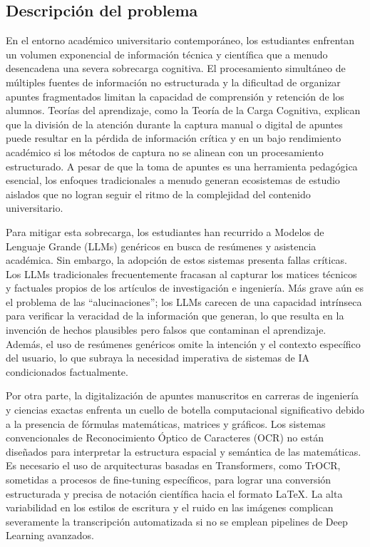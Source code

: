 \subsection{Descripción del problema}
En el entorno académico universitario contemporáneo, los estudiantes enfrentan un volumen exponencial de información técnica y científica que a menudo desencadena una severa sobrecarga cognitiva. El procesamiento simultáneo de múltiples fuentes de información no estructurada y la dificultad de organizar apuntes fragmentados limitan la capacidad de comprensión y retención de los alumnos. Teorías del aprendizaje, como la Teoría de la Carga Cognitiva, explican que la división de la atención durante la captura manual o digital de apuntes puede resultar en la pérdida de información crítica y en un bajo rendimiento académico si los métodos de captura no se alinean con un procesamiento estructurado. A pesar de que la toma de apuntes es una herramienta pedagógica esencial, los enfoques tradicionales a menudo generan ecosistemas de estudio aislados que no logran seguir el ritmo de la complejidad del contenido universitario.

Para mitigar esta sobrecarga, los estudiantes han recurrido a Modelos de Lenguaje Grande (LLMs) genéricos en busca de resúmenes y asistencia académica. Sin embargo, la adopción de estos sistemas presenta fallas críticas. Los LLMs tradicionales frecuentemente fracasan al capturar los matices técnicos y factuales propios de los artículos de investigación e ingeniería. Más grave aún es el problema de las ``alucinaciones''; los LLMs carecen de una capacidad intrínseca para verificar la veracidad de la información que generan, lo que resulta en la invención de hechos plausibles pero falsos que contaminan el aprendizaje. Además, el uso de resúmenes genéricos omite la intención y el contexto específico del usuario, lo que subraya la necesidad imperativa de sistemas de IA condicionados factualmente.

Por otra parte, la digitalización de apuntes manuscritos en carreras de ingeniería y ciencias exactas enfrenta un cuello de botella computacional significativo debido a la presencia de fórmulas matemáticas, matrices y gráficos. Los sistemas convencionales de Reconocimiento Óptico de Caracteres (OCR) no están diseñados para interpretar la estructura espacial y semántica de las matemáticas. Es necesario el uso de arquitecturas basadas en Transformers, como TrOCR, sometidas a procesos de fine-tuning específicos, para lograr una conversión estructurada y precisa de notación científica hacia el formato LaTeX. La alta variabilidad en los estilos de escritura y el ruido en las imágenes complican severamente la transcripción automatizada si no se emplean pipelines de Deep Learning avanzados.

